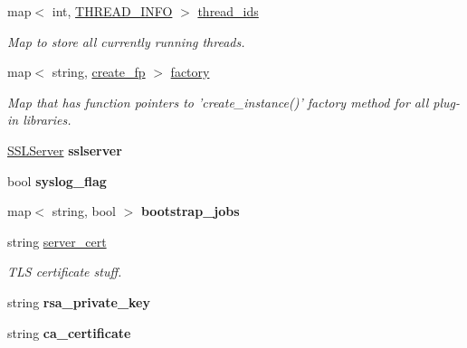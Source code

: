 \begin{DoxyCompactItemize}
\item 
\hypertarget{classgeneric__server_ac8fa269bdb179f753e8acb5f531de682}{map$<$ int, \hyperlink{generic__server_8h_a877c4c2e2b2e21aa81ed78993c4fc85d}{T\-H\-R\-E\-A\-D\-\_\-\-I\-N\-F\-O} $>$ \hyperlink{classgeneric__server_ac8fa269bdb179f753e8acb5f531de682}{thread\-\_\-ids}}\label{classgeneric__server_ac8fa269bdb179f753e8acb5f531de682}

\begin{DoxyCompactList}\small\item\em Map to store all currently running threads. \end{DoxyCompactList}\item 
\hypertarget{classgeneric__server_a9e038bde8956ed084a800c51aaaae62a}{map$<$ string, \hyperlink{generic__server_8h_a9aee3b373ab8283d16a7b8303fc27904}{create\-\_\-fp} $>$ \hyperlink{classgeneric__server_a9e038bde8956ed084a800c51aaaae62a}{factory}}\label{classgeneric__server_a9e038bde8956ed084a800c51aaaae62a}

\begin{DoxyCompactList}\small\item\em Map that has function pointers to 'create\-\_\-instance()' factory method for all plug-\/in libraries. \end{DoxyCompactList}\item 
\hypertarget{classgeneric__server_aa4b754bc2ef0cfbdba97df45c5b14ea6}{\hyperlink{classSSLServer}{S\-S\-L\-Server} {\bfseries sslserver}}\label{classgeneric__server_aa4b754bc2ef0cfbdba97df45c5b14ea6}

\item 
\hypertarget{classgeneric__server_a150c2988e43e1f08c6f02bf18556d1ca}{bool {\bfseries syslog\-\_\-flag}}\label{classgeneric__server_a150c2988e43e1f08c6f02bf18556d1ca}

\item 
\hypertarget{classgeneric__server_a3676e2b85ddbdaa47c4f7c30565f67d3}{map$<$ string, bool $>$ {\bfseries bootstrap\-\_\-jobs}}\label{classgeneric__server_a3676e2b85ddbdaa47c4f7c30565f67d3}

\item 
\hypertarget{classgeneric__server_a4637878babe3e9c859305da7f27edc4d}{string \hyperlink{classgeneric__server_a4637878babe3e9c859305da7f27edc4d}{server\-\_\-cert}}\label{classgeneric__server_a4637878babe3e9c859305da7f27edc4d}

\begin{DoxyCompactList}\small\item\em T\-L\-S certificate stuff. \end{DoxyCompactList}\item 
\hypertarget{classgeneric__server_a0948de8874a61c2ddb0b4dd61a183620}{string {\bfseries rsa\-\_\-private\-\_\-key}}\label{classgeneric__server_a0948de8874a61c2ddb0b4dd61a183620}

\item 
\hypertarget{classgeneric__server_a30a83dd82d204fe8434aaf74a1e6653f}{string {\bfseries ca\-\_\-certificate}}\label{classgeneric__server_a30a83dd82d204fe8434aaf74a1e6653f}

\end{DoxyCompactItemize}
